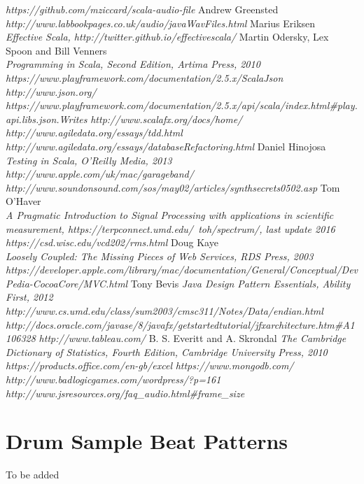 \documentclass[a4paper, 11pt]{article}
\begin{document}
\begin{thebibliography}{99}
\textit{https://github.com/mziccard/scala-audio-file}
Andrew Greensted
\textit{http://www.labbookpages.co.uk/audio/javaWavFiles.html}
Marius Eriksen\\
\textit{Effective Scala, http://twitter.github.io/effectivescala/}
Martin Odersky, Lex Spoon and Bill Venners\\
\textit{Programming in Scala, Second Edition, Artima Press, 2010}
\textit{https://www.playframework.com/documentation/2.5.x/ScalaJson}
\textit{http://www.json.org/}
\textit{https://www.playframework.com/documentation/2.5.x/api/scala/index.html\#play.api.libs.json.Writes}
\textit{http://www.scalafx.org/docs/home/}
\textit{http://www.agiledata.org/essays/tdd.html}
\textit{http://www.agiledata.org/essays/databaseRefactoring.html}
Daniel Hinojosa\\
\textit{Testing in Scala, O’Reilly Media, 2013}
\textit{http://www.apple.com/uk/mac/garageband/}
\textit{http://www.soundonsound.com/sos/may02/articles/synthsecrets0502.asp}
Tom O'Haver\\
\textit{A Pragmatic Introduction to Signal Processing with applications in scientific measurement, https://terpconnect.umd.edu/~toh/spectrum/, last update 2016}
\textit{https://csd.wisc.edu/vcd202/rms.html}
Doug Kaye\\
\textit{Loosely Coupled: The Missing Pieces of Web Services, RDS Press, 2003}
\textit{https://developer.apple.com/library/mac/documentation/General/Conceptual/DevPedia-CocoaCore/MVC.html}
Tony Bevis
\textit{Java Design Pattern Essentials, Ability First, 2012}
\textit{http://www.cs.umd.edu/class/sum2003/cmsc311/Notes/Data/endian.html}
\textit{http://docs.oracle.com/javase/8/javafx/get\-started\-tutorial/jfx\-architecture.htm\#A1106328}
\textit{http://www.tableau.com/}
B. S. Everitt and A. Skrondal
\textit{The Cambridge Dictionary of Statistics, Fourth Edition, Cambridge University Press, 2010}
\textit{https://products.office.com/en-gb/excel}
\textit{https://www.mongodb.com/}
\textit{http://www.badlogicgames.com/wordpress/?p=161}
\textit{http://www.jsresources.org/faq\_audio.html#frame\_size}
\end{thebibliography}

\newpage

\appendix
\section{Drum Sample Beat Patterns}
To be added
\end{document}
